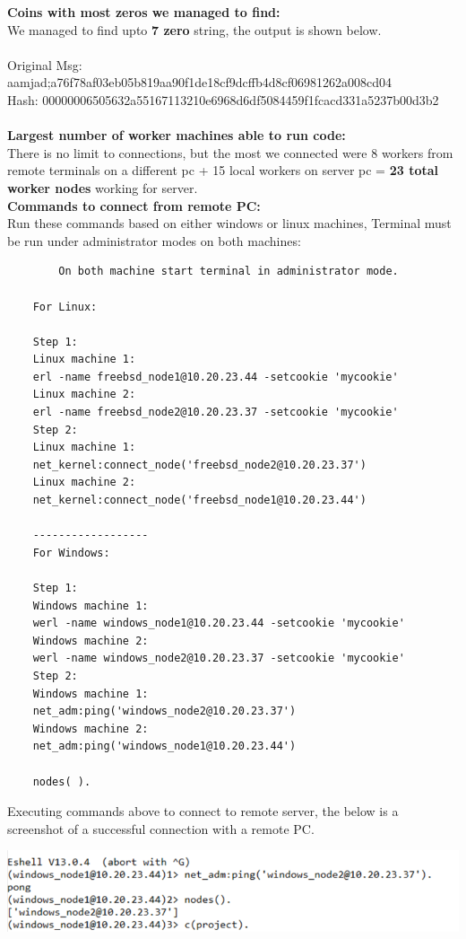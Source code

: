 \documentclass[11pt, pdftex]{article}
\begin{document}
	\textbf{Coins with most zeros we managed to find:}  \\
	We managed to find upto \textbf{7 zero} string, the output is shown below. \\ \\
	Original Msg: aamjad;a76f78af03eb05b819aa90f1de18cf9dcffb4d8cf06981262a008cd04 \\
	Hash: 00000006505632a55167113210e6968d6df5084459f1fcacd331a5237b00d3b2 \\ \\
	
	\textbf{Largest number of worker machines able to run code:}  \\There is no limit to connections, but the most we connected were 8 workers from remote terminals on a different pc + 15 local workers on server pc = \textbf{23 total worker nodes} working for server. \\
	
	\textbf{Commands to connect from remote PC:} \\
	Run these commands based on either windows or linux machines, Terminal must be run under administrator modes on both machines: \\
	
	\begin{verbatim}
		On both machine start terminal in administrator mode.
	
	For Linux:	
	
	Step 1:	
	Linux machine 1:
	erl -name freebsd_node1@10.20.23.44 -setcookie 'mycookie'
	Linux machine 2:
	erl -name freebsd_node2@10.20.23.37 -setcookie 'mycookie'
	Step 2:
	Linux machine 1:
	net_kernel:connect_node('freebsd_node2@10.20.23.37')
	Linux machine 2:
	net_kernel:connect_node('freebsd_node1@10.20.23.44')
	
	------------------
	For Windows:
	
	Step 1:
	Windows machine 1:
	werl -name windows_node1@10.20.23.44 -setcookie 'mycookie'
	Windows machine 2:
	werl -name windows_node2@10.20.23.37 -setcookie 'mycookie'
	Step 2:
	Windows machine 1:
	net_adm:ping('windows_node2@10.20.23.37')
	Windows machine 2:
	net_adm:ping('windows_node1@10.20.23.44')
	
	nodes( ). 
	\end{verbatim} 
	
	Executing commands above to connect to remote server, the below is a screenshot of a successful connection with a remote PC.
	
	\includegraphics{Picture2.png} \\
	
\end{document}
